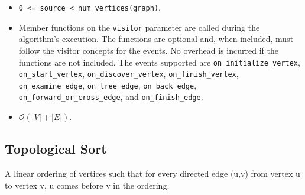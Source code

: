 \begin{itemdescr}
      \hardprecond
            \begin{itemize}
                  \item
                        \lstinline{0 <= source < num_vertices(graph)}.
            \end{itemize}
      \pnum\effects
            \begin{itemize}
                  \item Member functions on the \lstinline{visitor} parameter are called during the algorithm's execution.
                        The functions are optional and, when included, must follow the visitor concepts for the events.
                        No overhead is incurred if the functions are not included.
                        The events supported are \lstinline{on_initialize_vertex}, \lstinline{on_start_vertex},
                        \lstinline{on_discover_vertex}, \lstinline{on_finish_vertex}, 
                        \lstinline{on_examine_edge}, \lstinline{on_tree_edge}, \lstinline{on_back_edge},
                        \lstinline{on_forward_or_cross_edge}, and \lstinline{on_finish_edge}.
            \end{itemize}
      \pnum\complexity
            \begin{itemize}
                  \item $\mathcal{O}(|V| + |E|)$.
            \end{itemize}
\end{itemdescr}

\subsection{Topological Sort}
A linear ordering of vertices such that for every directed edge (u,v) from vertex u to vertex v, u comes before v in the ordering.

